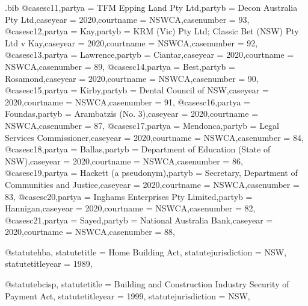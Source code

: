 

\begin{filecontents*}{\jobname.bib}
@case{sc11,partya = {TFM Epping Land Pty Ltd},partyb = {Decon Australia Pty Ltd},caseyear = {2020},courtname = {NSWCA},casenumber = {93},}
@case{sc12,partya = {Kay},partyb = {KRM (Vic) Pty Ltd; Classic Bet (NSW) Pty Ltd v Kay},caseyear = {2020},courtname = {NSWCA},casenumber = {92},}
@case{sc13,partya = {Lawrence},partyb = {Ciantar},caseyear = {2020},courtname = {NSWCA},casenumber = {89},}
@case{sc14,partya = {Best},partyb = {Rosamond},caseyear = {2020},courtname = {NSWCA},casenumber = {90},}
@case{sc15,partya = {Kirby},partyb = {Dental Council of NSW},caseyear = {2020},courtname = {NSWCA},casenumber = {91},}
@case{sc16,partya = {Foundas},partyb = {Arambatzis (No. 3)},caseyear = {2020},courtname = {NSWCA},casenumber = {87},}
@case{sc17,partya = {Mendonca},partyb = {Legal Services Commissioner},caseyear = {2020},courtname = {NSWCA},casenumber = {84},}
@case{sc18,partya = {Ballas},partyb = {Department of Education (State of NSW)},caseyear = {2020},courtname = {NSWCA},casenumber = {86},}
@case{sc19,partya = {Hackett (a pseudonym)},partyb = {Secretary, Department of Communities and Justice},caseyear = {2020},courtname = {NSWCA},casenumber = {83},}
@case{sc20,partya = {Inghams Enterprises Pty Limited},partyb = {Hannigan},caseyear = {2020},courtname = {NSWCA},casenumber = {82},}
@case{sc21,partya = {Sayed},partyb = {National Australia Bank},caseyear = {2020},courtname = {NSWCA},casenumber = {88},}

@statute{hba,
statutetitle = {Home Building Act},
statutejurisdiction = {NSW},
statutetitleyear = {1989},
}

@statute{bcisp,
statutetitle = {Building and Construction Industry Security of Payment Act},
statutetitleyear = {1999},
statutejurisdiction = {NSW},
}


\end{filecontents*}
